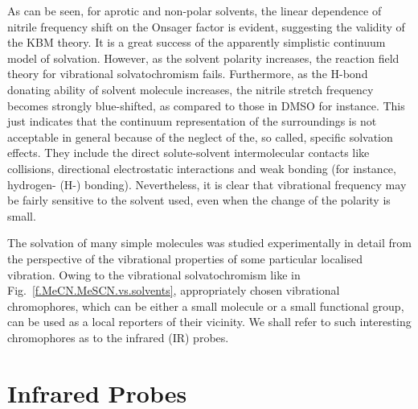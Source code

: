 \documentclass[b5paper,oneside,fleqn,11pt]{book}
\begin{document}
\begin{refsection}
As can be seen, for aprotic and non\hyp{}polar solvents, the linear dependence of
nitrile frequency shift on the Onsager factor is evident, suggesting the validity of the KBM theory.
It is a great success of the apparently simplistic continuum model of solvation. 
However, as the solvent polarity increases, the reaction field 
theory for vibrational solvatochromism fails. Furthermore, as the H-bond donating ability of 
solvent molecule increases, the nitrile stretch frequency becomes strongly blue-shifted, as 
compared to those in DMSO for instance. \citep{Wilderen.Luuk.Kern-Michler.Muller-Werkmeister.Bredenbeck.PCCP.2014}
This just indicates that the continuum representation of the surroundings is not acceptable in general
because of the neglect of the, so called, specific solvation effects. 
They include the direct solute\hyp{}solvent intermolecular
contacts like collisions, directional electrostatic interactions and weak bonding (for instance, hydrogen- (H-) bonding).
Nevertheless, it is clear that vibrational frequency may be fairly sensitive 
to the solvent used, even when the change of the polarity is small.

The solvation of many simple molecules was studied experimentally in detail from the perspective of the 
vibrational properties of some particular localised vibration. \citep{Rowlen.Harris.AnalChem.1991,Mayne.Hudson.JPC.1991,
Janroz.Stangret.Lindgren.JACS.1993,Akiyama.Ohtani.SpectchimActA.1994,
Reimers.Hall.JACS.1999,Wilderen.Luuk.Kern-Michler.Muller-Werkmeister.Bredenbeck.PCCP.2014,Jansen.JPCB.2014} 
Owing to the vibrational solvatochromism
like in Fig.~\ref{f.MeCN.MeSCN.vs.solvents}, 
appropriately chosen vibrational chromophores, which can be either a small molecule or a small functional
group, can be used as a local reporters of their vicinity. \citep{Kim.Cho.ChemRev.2013} 
We shall refer to such interesting chromophores as to the infrared (IR) probes. 

\section{Infrared Probes}


\end{refsection}
\end{document}
